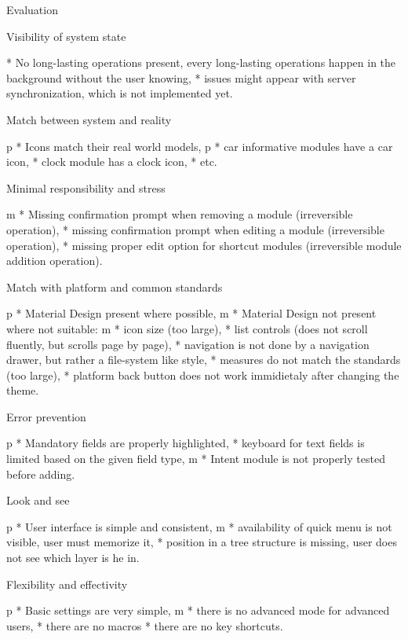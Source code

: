 \secc Evaluation

\seccc Visibility of system state

\begitems 
* No long-lasting operations present, every long-lasting operations happen in the background without the user knowing,
* issues might appear with server synchronization, which is not implemented yet.
\enditems

\seccc Match between system and reality

\begitems \style p
* Icons match their real world models,
  \begitems \style p
  * car informative modules have a car icon,
  * clock module has a clock icon,
  * etc.
  \enditems
\enditems

\seccc Minimal responsibility and stress

\begitems \style m
* Missing confirmation prompt when removing a module (irreversible operation),
* missing confirmation prompt when editing a module (irreversible operation),
* missing proper edit option for shortcut modules (irreversible module addition operation).
\enditems

\seccc Match with platform and common standards

\begitems \style p
* Material Design present where possible,
\style m
* Material Design not present where not suitable:
  \begitems \style m
  * icon size (too large),
  * list controls (does not scroll fluently, but scrolls page by page),
  * navigation is not done by a navigation drawer, but rather a file-system like style,
  * measures do not match the standards (too large),
  * platform back button does not work immidietaly after changing the theme.
  \enditems
\enditems

\seccc Error prevention

\begitems \style p
* Mandatory fields are properly highlighted,
* keyboard for text fields is limited based on the given field type,
\style m
* Intent module is not properly tested before adding.
\enditems

\seccc Look and see

\begitems
\style p
* User interface is simple and consistent,
\style m
* availability of quick menu is not visible, user must memorize it,
* position in a tree structure is missing, user does not see which layer is he in. 
\enditems

\seccc Flexibility and effectivity

\begitems
\style p
* Basic settings are very simple,
\style m
* there is no advanced mode for advanced users,
* there are no macros
* there are no key shortcuts.
\enditems

